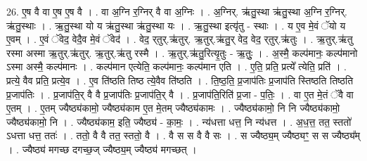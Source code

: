 \documentclass[17pt]{extarticle}
\begin{document}
26. ए॒ष वै वा ए॒ष ए॒ष वै । . वा अ॒ग्नि र॒ग्निर् वै वा अ॒ग्निः । . अ॒ग्निर्. ऋ॑तु॒स्था ऋ॑तु॒स्था अ॒ग्नि र॒ग्निर्. ऋ॑तु॒स्थाः । . ऋ॒तु॒स्था यो य ऋ॑तु॒स्था ऋ॑तु॒स्था यः । . ऋ॒तु॒स्था इत्यृ॑तु - स्थाः । . य ए॒व मे॒वं ॅयो य ए॒वम् । . ए॒वं ॅवेद॒ वेदै॒व मे॒वं ॅवेद॑ । . वेद॒ र्‌तुर्.ऋ॑तुर्. ऋ॒तुर्.ऋ॑तु॒र् वेद॒ वेद॒ र्‌तुर्.ऋ॑तुः । . ऋ॒तुर्.ऋ॑तु रस्मा अस्मा ऋ॒तुर्.ऋ॑तुर्. ऋ॒तुर्.ऋ॑तु रस्मै । . ऋ॒तुर्.ऋ॑तु॒रित्यृ॒तुः - ऋ॒तुः॒ । . अ॒स्मै॒ कल्प॑मानः॒ कल्प॑मानो ऽस्मा अस्मै॒ कल्प॑मानः । . कल्प॑मान एत्येति॒ कल्प॑मानः॒ कल्प॑मान एति । . ए॒ति॒ प्रति॒ प्रत्ये᳚ त्येति॒ प्रति॑ । . प्रत्ये॒ वैव प्रति॒ प्रत्ये॒व । . ए॒व ति॑ष्ठति तिष्ठ त्ये॒वैव ति॑ष्ठति । . ति॒ष्ठ॒ति॒ प्र॒जाप॑तिः प्र॒जाप॑ति स्तिष्ठति तिष्ठति प्र॒जाप॑तिः । . प्र॒जाप॑ति॒र् वै वै प्र॒जाप॑तिः प्र॒जाप॑ति॒र् वै । . प्र॒जाप॑ति॒रिति॑ प्र॒जा - प॒तिः॒ । . वा ए॒त मे॒तं ॅवै वा ए॒तम् । . ए॒तम् ज्यैष्ठ्य॑कामो॒ ज्यैष्ठ्य॑काम ए॒त मे॒तम् ज्यैष्ठ्य॑कामः । . ज्यैष्ठ्य॑कामो॒ नि नि ज्यैष्ठ्य॑कामो॒ ज्यैष्ठ्य॑कामो॒ नि । . ज्यैष्ठ्य॑काम॒ इति॒ ज्यैष्ठ्य॑ - का॒मः॒ । . न्य॑धत्ता धत्त॒ नि न्य॑धत्त । . अ॒ध॒त्त॒ तत॒ स्ततो॑ ऽधत्ता धत्त॒ ततः॑ । . ततो॒ वै वै तत॒ स्ततो॒ वै । . वै स स वै वै सः । . स ज्यैष्ठ्य॒म् ज्यैष्ठ्यꣳ॒॒ स स ज्यैष्ठ्य᳚म् । . ज्यैष्ठ्य॑ मगच्छ दगच्छ॒ज् ज्यैष्ठ्य॒म् ज्यैष्ठ्य॑ मगच्छत् । \newline
\end{document}
